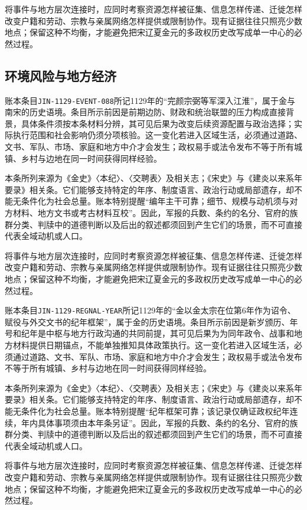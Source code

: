 将事件与地方层次连接时，应同时考察资源怎样被征集、信息怎样传递、迁徙怎样改变户籍和劳动、宗教与亲属网络怎样提供或限制协作。现有证据往往只照亮少数地点；保留这种不均衡，才能避免把宋辽夏金元的多政权历史改写成单一中心的必然过程。

\subsection{环境风险与地方经济}

账本条目\texttt{JIN-1129-EVENT-088}所记1129年的“完颜宗弼等军深入江淮”，属于金与南宋的历史语境。条目所示前因是前期边防、财政和统治联盟的压力构成直接背景，具体条件须按本条材料分辨，其可见后果为改变后续资源配置与政治选择；实际执行范围和社会影响仍须分项核验。这一变化若进入区域生活，必须通过道路、文书、军队、市场、家庭和地方中介才会发生；政权易手或法令发布不等于所有城镇、乡村与边地在同一时间获得同样经验。

本条所列来源为《金史》〈本纪〉、〈交聘表〉及相关志；《宋史》与《建炎以来系年要录》相关条。它们能够支持特定的年序、制度语言、政治行动或局部遗存，却不能无条件化为社会总量。账本特别提醒“编年主干可靠；细节、规模与动机须与对方材料、地方文书或考古材料互校”。因此，军报的兵数、条约的名分、官府的族群分类、判牍中的道德判断以及后出的叙述都须回到产生它们的场景，而不可直接代表全域动机或人口。

将事件与地方层次连接时，应同时考察资源怎样被征集、信息怎样传递、迁徙怎样改变户籍和劳动、宗教与亲属网络怎样提供或限制协作。现有证据往往只照亮少数地点；保留这种不均衡，才能避免把宋辽夏金元的多政权历史改写成单一中心的必然过程。

账本条目\texttt{JIN-1129-REGNAL-YEAR}所记1129年的“金以金太宗在位第6年作为诏令、赋役与外交文书的纪年框架”，属于金的历史语境。条目所示前因是新岁颁历、年号和纪年是中枢与地方行政沟通的共同前提，其可见后果为为同年政令、战事和地方材料提供日期锚点，不能单独推知具体政策执行。这一变化若进入区域生活，必须通过道路、文书、军队、市场、家庭和地方中介才会发生；政权易手或法令发布不等于所有城镇、乡村与边地在同一时间获得同样经验。

本条所列来源为《金史》〈本纪〉、〈交聘表〉及相关志；《宋史》与《建炎以来系年要录》相关条。它们能够支持特定的年序、制度语言、政治行动或局部遗存，却不能无条件化为社会总量。账本特别提醒“纪年框架可靠；该记录仅确证政权纪年连续，年内具体事项须由本年条另证”。因此，军报的兵数、条约的名分、官府的族群分类、判牍中的道德判断以及后出的叙述都须回到产生它们的场景，而不可直接代表全域动机或人口。

将事件与地方层次连接时，应同时考察资源怎样被征集、信息怎样传递、迁徙怎样改变户籍和劳动、宗教与亲属网络怎样提供或限制协作。现有证据往往只照亮少数地点；保留这种不均衡，才能避免把宋辽夏金元的多政权历史改写成单一中心的必然过程。

